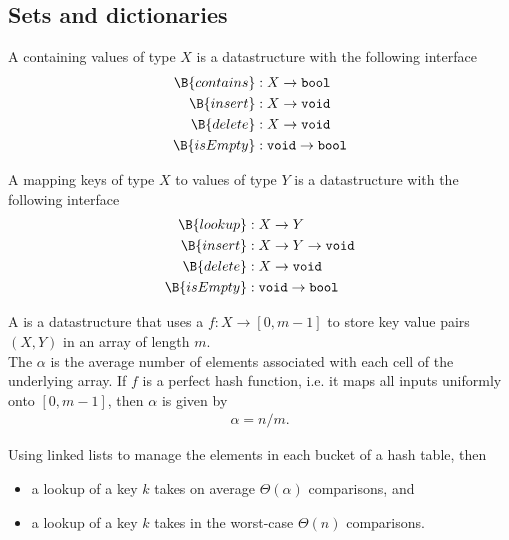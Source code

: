 \documentclass{article}
\begin{document}
\subsection{Sets and dictionaries}


\begin{definition}
	A  containing values of type $X$ is a datastructure with the following interface
	\begin{align*}
		\B{contains} &: X\to \texttt{bool}\\
		\B{insert} &: X \to \texttt{void}\\
		\B{delete} &: X \to \texttt{void}\\
		\B{isEmpty} &: \texttt{void} \to \texttt{bool}
	\end{align*}
\end{definition}
\begin{definition}
	A  mapping keys of type $X$ to values of type $Y$
	is a datastructure with the following interface
	\begin{align*}
		\B{lookup} &: X \to Y\\
		\B{insert} &: X \to Y \to \texttt{void}\\
		\B{delete} &: X \to \texttt{void}\\
		\B{isEmpty} &: \texttt{void} \to \texttt{bool}
	\end{align*}
\end{definition}
\begin{definition}
	A  is a datastructure that uses a  $f: X \to [0,m-1]$
	to store key value pairs $(X,Y)$ in an array of length $m$.\\
	The  $\alpha$ is the average number of elements associated with each cell
	of the underlying array. If $f$ is a perfect hash function, i.e. it maps all inputs uniformly
	onto $[0,m-1]$, then $\alpha$ is given by 
	\begin{align*}
		\alpha = n / m.
	\end{align*}
\end{definition}
\begin{proposition}
	Using linked lists to manage the elements in each bucket of a hash table, then
	\begin{itemize}
		\item a lookup of a key $k$  takes on average $\Theta(\alpha)$ comparisons, and
		\item a lookup of a key $k$ takes in the worst-case $\Theta(n)$ comparisons.
	\end{itemize}
\end{proposition}
\end{document}
